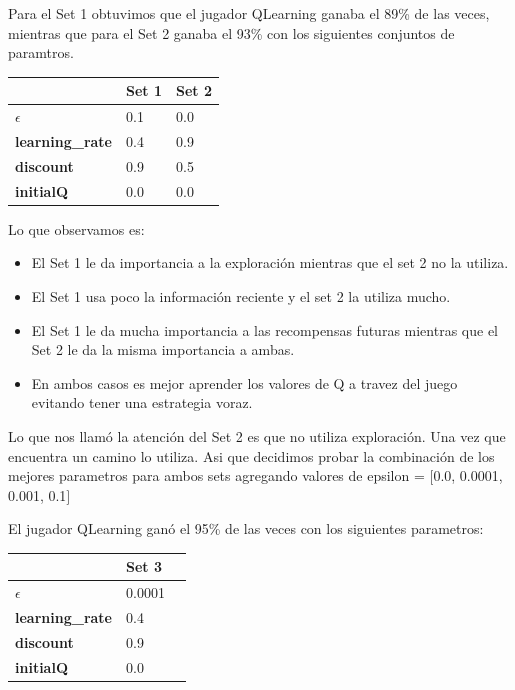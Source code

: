 Para el Set 1 obtuvimos que el jugador QLearning ganaba el 89\% de las veces, mientras que para el Set 2 ganaba el 93\% con los siguientes conjuntos de paramtros. 

\begin{center}
    \begin{tabular}{| l | l | l |}
    \hline
     					    &  \textbf{Set 1} & \textbf{Set 2} \\ \hline
    \textbf{$\epsilon$}     &  0.1   		  & 0.0   \\
    \textbf{learning\_rate} &  0.4   		  & 0.9   \\ 
    \textbf{discount}       &  0.9  		  & 0.5   \\ 
	\textbf{initialQ} 		&  0.0   		  & 0.0   \\
    \hline
    \end{tabular}
\end{center}

Lo que observamos es:
\begin{itemize}
\item El Set 1 le da importancia a la exploración mientras que el set 2 no la utiliza. \\
\item El Set 1 usa poco la información reciente y el set 2 la utiliza mucho. \\
\item El Set 1 le da mucha importancia a las recompensas futuras mientras que el Set 2 le da la misma importancia a ambas. \\
\item En ambos casos es mejor aprender los valores de Q a travez del juego evitando tener una estrategia voraz.\\
\end{itemize}

 
Lo que nos llamó la atención del Set 2 es que no utiliza exploración. Una vez que encuentra un camino lo utiliza. Asi que decidimos probar la combinación de los mejores parametros para ambos sets agregando valores de epsilon = $[$0.0, 0.0001, 0.001, 0.1$]$

El jugador QLearning ganó el 95\% de las veces con los siguientes parametros:
\begin{center}
    \begin{tabular}{| l | l | l |}
    \hline
     					    &  \textbf{Set 3} \\ \hline
    \textbf{$\epsilon$}     &  0.0001  		  \\
    \textbf{learning\_rate} &  0.4   		  \\ 
    \textbf{discount}       &  0.9  		  \\ 
	\textbf{initialQ} 		&  0.0   		  \\
    \hline
    \end{tabular}
\end{center}


